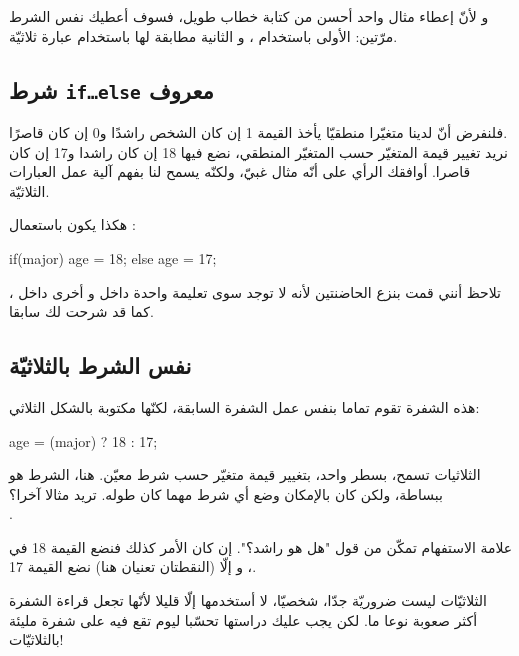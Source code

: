 و لأنّ إعطاء مثال واحد أحسن من كتابة خطاب طويل، فسوف أعطيك نفس الشرط مرّتين: الأولى باستخدام
،
و الثانية مطابقة لها باستخدام عبارة ثلاثيّة.
\subsection{شرط \texttt{if\dots else} معروف}

فلنفرض أنّ لدينا متغيّرا منطقيّا
يأخذ القيمة 1 إن كان الشخص راشدًا و0 إن كان قاصرًا.\\
نريد تغيير قيمة المتغيّر 
حسب المتغيّر المنطقي، نضع فيها 18 إن كان راشدا و17 إن كان قاصرا. أوافقك الرأي على أنّه مثال غبيّ، ولكنّه يسمح لنا بفهم آلية عمل العبارات الثلاثيّة.

هكذا يكون باستعمال :

\begin{Csource}
if(major)
	age = 18;
else
	age = 17;
\end{Csource}

\begin{information}
تلاحظ أنني قمت بنزع الحاضنتين لأنه لا توجد سوى تعليمة واحدة داخل 
و أخرى داخل 
،
كما قد شرحت لك سابقا.
\end{information}

\subsection{نفس الشرط بالثلاثيّة}

هذه الشفرة تقوم تماما بنفس عمل الشفرة السابقة، لكنّها مكتوبة بالشكل الثلاثي: 

\begin{Csource}
age = (major) ? 18 : 17;
\end{Csource}

الثلاثيات تسمح، بسطر واحد، بتغيير قيمة متغيّر حسب شرط معيّن. هنا، الشرط هو
ببساطة، ولكن كان بالإمكان وضع أي شرط مهما كان طوله. تريد مثالا آخرا؟\\ 
.

علامة الاستفهام تمكّن من قول "هل هو راشد؟". إن كان الأمر كذلك فنضع القيمة 18 في
،
و إلّا (النقطتان تعنيان
هنا) نضع القيمة 17.

الثلاثيّات ليست ضروريّة جدّا، شخصيّا، لا أستخدمها إلّا قليلا لأنّها تجعل قراءة الشفرة أكثر صعوبة نوعا ما. لكن يجب عليك دراستها تحسّبا ليوم تقع فيه على شفرة مليئة بالثلاثيّات!

